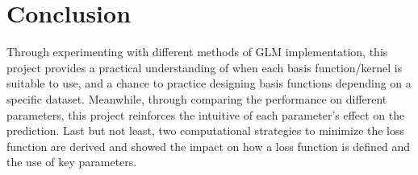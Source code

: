 \documentclass{article} %
\begin{document}
\section*{Conclusion} %
Through experimenting with different methods of GLM implementation, this project provides a practical understanding of when each basis function/kernel is suitable to use, and a chance to practice designing basis functions depending on a specific dataset. Meanwhile, through comparing the performance on different parameters, this project reinforces the intuitive of each parameter's effect on the prediction.
Last but not least, two computational strategies to minimize the loss function are derived and showed the impact on how a loss function is defined and the use of key parameters.
\end{document}

